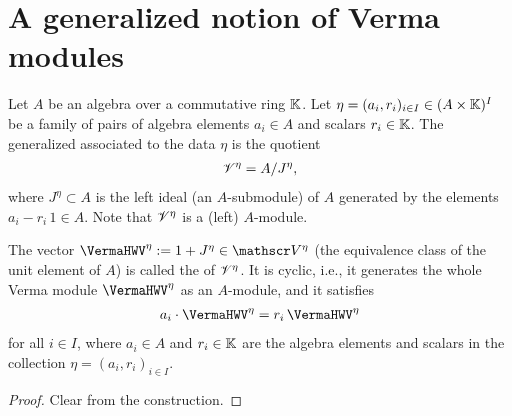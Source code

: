 \section{A generalized notion of Verma modules}

\begin{definition}
  \label{def:VermaModule}
  \leanok
  Let $A$ be an algebra over a commutative ring $\mathbb{K}$.
  Let $\eta = (a_i, r_i)_{i \in I} \in (A \times \mathbb{K})^I$
  be a family of pairs of algebra elements $a_i \in A$ and
  scalars $r_i \in \mathbb{K}$.
  The generalized  associated to the data $\eta$
  is the quotient
  \begin{align*}
    \mathscr{V}^{\eta} = A / J^{\eta} ,
  \end{align*}
  where $J^{\eta} \subset A$  is the left ideal (an $A$-submodule) of $A$
  generated by the elements $a_i - r_i \, 1 \in A$.
  Note that $\mathscr{V}^{\eta}$ is a (left) $A$-module.
\end{definition}

\begin{lemma}
  \label{def:HighestWeightVector}
  \leanok
  The vector $\VermaHWV^{\eta} := 1 + J^{\eta} \in \Verma^{\eta}$
  (the equivalence class of the unit element of $A$)
  is called the  of $\mathscr{V}^{\eta}$.
  It is cyclic, i.e., it generates the whole Verma module $\VermaHWV^{\eta}$
  as an $A$-module, and it satisfies
  \begin{align*}
    a_i \cdot \VermaHWV^{\eta} = r_i \, \VermaHWV^{\eta}
  \end{align*}
  for all $i \in I$, where $a_i \in A$ and $r_i \in \mathbb{K}$
  are the algebra elements and scalars in the collection
  $\eta = (a_i, r_i)_{i \in I}$.
\end{lemma}
\begin{proof}
  \leanok
  Clear from the construction.
\end{proof}

